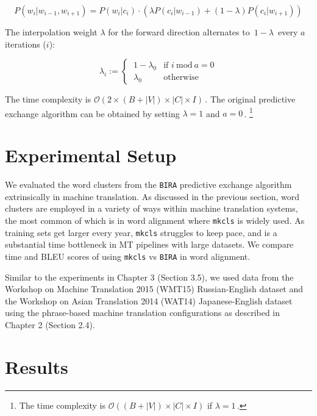 \begin{equation}
P(w_{ i }|w_{ i-1 },w_{ i+1 }) = P(w_{ i }|c_{ i }) \cdot (\lambda P(c_{ i }|w_{ i-1 }) +(1-\lambda )P(c_{ i }|w_{ i+1 }))
\end{equation}


The interpolation weight $\lambda$ for the forward direction alternates to \,$1-\lambda$\, every $a$ iterations ($i$): 

\begin{equation}
\lambda_i := \begin{cases}
	\ 1-\lambda_0 & \mbox{if \ \ } i \ \text{mod} \  a = 0 \\
	\ \lambda_0 & \mbox{otherwise}
\end{cases}
\end{equation}

The time complexity is $\mathcal{O}(2 \times (B + |V|) \times |C| \times I)$\,.
The original predictive exchange algorithm can be obtained by setting $\lambda=1$ and $a=0$\,.%
\footnote{The time complexity is $ \mathcal{O}((B + |V|) \times |C| \times I) $ if $\lambda=1$\,.}

\section{Experimental Setup}

We evaluated the word clusters from the {\tt BIRA} predictive exchange algorithm extrinsically in machine translation. As discussed in the previous section, word clusters are employed in a variety of ways within machine translation systems, the most common of which is in word alignment where {\tt mkcls} is widely used. As training sets get larger every year, {\tt mkcls} struggles to keep pace, and is a substantial time bottleneck in MT pipelines with large datasets. We compare time and BLEU scores of using {\tt mkcls} vs {\tt BIRA} in word alignment.

Similar to the experiments in Chapter 3 (Section 3.5), we used data from the Workshop on Machine Translation 2015 (WMT15) Russian-English dataset and the Workshop on Asian Translation 2014 (WAT14) Japanese-English dataset using the phrase-based machine translation configurations as described in Chapter 2 (Section 2.4). 

\section{Results}

